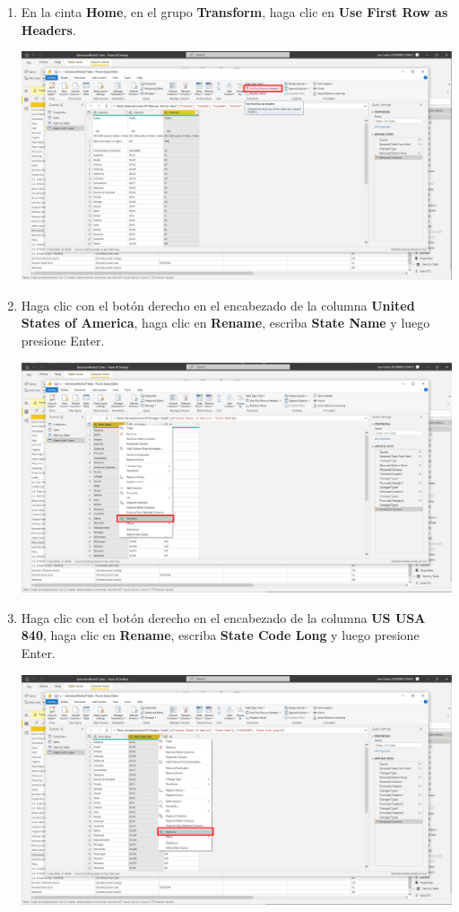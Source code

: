 \documentclass[12pt,letterpaper]{article}
\newcommand\tab[1][1cm]{\hspace*{#1}}
\begin{document}
\begin{enumerate}[\tab 1.]
\begin{center}
        \end{center}
        \item En la cinta \textbf{Home}, en el grupo \textbf{Transform}, haga clic en \textbf{Use First Row as Headers}.
        \begin{center}
            \includegraphics[width=13cm]{./img/img65.png}
        \end{center}
        \item Haga clic con el botón derecho en el encabezado de la columna \textbf{United States of America}, haga clic en \textbf{Rename}, escriba \textbf{State Name} y luego presione Enter.
        \begin{center}
            \includegraphics[width=13cm]{./img/img66.png}
        \end{center}
        \item Haga clic con el botón derecho en el encabezado de la columna \textbf{US USA 840}, haga clic en \textbf{Rename}, escriba \textbf{State Code Long} y luego presione Enter.
        \begin{center}
            \includegraphics[width=13cm]{./img/img67.png}

\end{center}
\end{enumerate}
\end{document}
